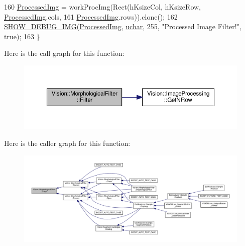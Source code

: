 \begin{DoxyCode}
160   \hyperlink{class_vision_1_1_image_processing_aa7d65742882cd1b2a1e4e9cb68809211}{ProcessedImg} = workProcImg(Rect(hKsizeCol, hKsizeRow, \hyperlink{class_vision_1_1_image_processing_aa7d65742882cd1b2a1e4e9cb68809211}{ProcessedImg}.cols,
161                                   \hyperlink{class_vision_1_1_image_processing_aa7d65742882cd1b2a1e4e9cb68809211}{ProcessedImg}.rows)).clone();
162   \hyperlink{_vision_debug_8h_aae864fa4f990213a4184a209ff236202}{SHOW\_DEBUG\_IMG}(\hyperlink{class_vision_1_1_image_processing_aa7d65742882cd1b2a1e4e9cb68809211}{ProcessedImg}, \hyperlink{_soil_math_types_8h_a65f85814a8290f9797005d3b28e7e5fc}{uchar}, 255, \textcolor{stringliteral}{"Processed Image Filter!"}, \textcolor{keyword}{true});
163 \}
\end{DoxyCode}


Here is the call graph for this function\+:\nopagebreak
\begin{figure}[H]
\begin{center}
\leavevmode
\includegraphics[width=350pt]{class_vision_1_1_morphological_filter_ab743062372a8d0b26dabfd27451e72ed_cgraph}
\end{center}
\end{figure}




Here is the caller graph for this function\+:\nopagebreak
\begin{figure}[H]
\begin{center}
\leavevmode
\includegraphics[width=350pt]{class_vision_1_1_morphological_filter_ab743062372a8d0b26dabfd27451e72ed_icgraph}
\end{center}
\end{figure}


